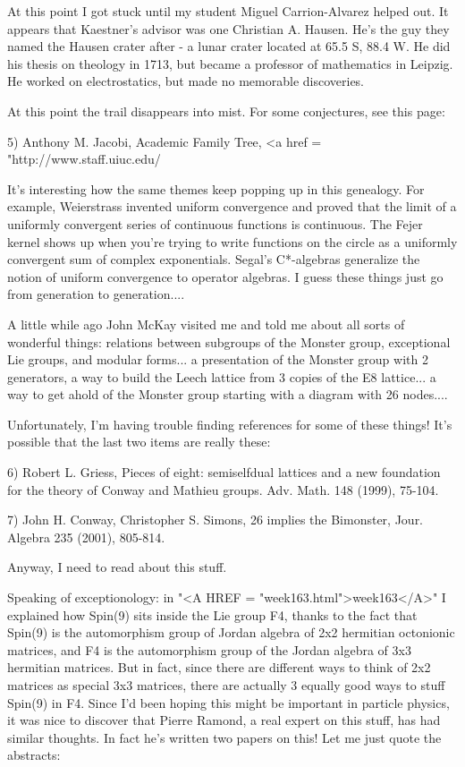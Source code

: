 At this point I got stuck until my student Miguel Carrion-Alvarez
helped out.  It appears that Kaestner's advisor was one Christian
A. Hausen.  He's the guy they named the Hausen crater after - a lunar
crater located at 65.5 S, 88.4 W.  He did his thesis on theology in
1713, but became a professor of mathematics in Leipzig.  He worked on
electrostatics, but made no memorable discoveries.


 At this point the trail disappears into mist.  For some
conjectures, see this page:

5) Anthony M. Jacobi, Academic Family Tree,
<a href = "http://www.staff.uiuc.edu/%


It's interesting how the same themes keep popping up in this
genealogy.  For example, Weierstrass invented uniform convergence and
proved that the limit of a uniformly convergent series of continuous
functions is continuous.  The Fejer kernel shows up when you're trying
to write functions on the circle as a uniformly convergent sum of
complex exponentials.  Segal's C*-algebras generalize the notion of
uniform convergence to operator algebras.  I guess these things just
go from generation to generation....

A little while ago John McKay visited me and told me about all sorts of
wonderful things: relations between subgroups of the Monster group,
exceptional Lie groups, and modular forms... a presentation of the
Monster group with 2 generators, a way to build the Leech lattice from 3
copies of the E8 lattice... a way to get ahold of the Monster group
starting with a diagram with 26 nodes....

Unfortunately, I'm having trouble finding references for some of these
things!  It's possible that the last two items are really these:


6) Robert L. Griess, Pieces of eight: semiselfdual lattices and a new
foundation for the theory of Conway and Mathieu groups. Adv. Math. 148
(1999), 75-104.  

7) John H. Conway, Christopher S. Simons, 26 implies the Bimonster,
Jour. Algebra 235 (2001), 805-814.

Anyway, I need to read about this stuff.


Speaking of exceptionology: in "<A HREF =
"week163.html">week163</A>" I explained how Spin(9) sits inside the
Lie group F4, thanks to the fact that Spin(9) is the automorphism group
of Jordan algebra of 2x2 hermitian octonionic matrices, and F4 is the
automorphism group of the Jordan algebra of 3x3 hermitian matrices.  But
in fact, since there are different ways to think of 2x2 matrices as
special 3x3 matrices, there are actually 3 equally good ways to stuff
Spin(9) in F4.  Since I'd been hoping this might be important in
particle physics, it was nice to discover that Pierre Ramond, a real
expert on this stuff, has had similar thoughts.  In fact he's written
two papers on this!  Let me just quote the abstracts:


